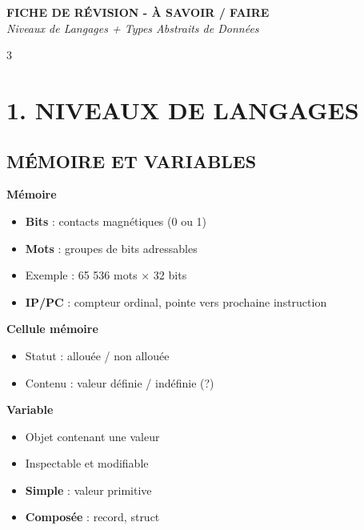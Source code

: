 \documentclass[10pt,a4paper,landscape]{article}
\begin{document}
\begin{center}
\LARGE\textbf{\color{titrebleu}FICHE DE RÉVISION - À SAVOIR / FAIRE}\\
\large\textit{Niveaux de Langages + Types Abstraits de Données}
\end{center}

\begin{multicols}{3}
\small

\section*{\color{titrebleu}1. NIVEAUX DE LANGAGES}

\subsection*{MÉMOIRE ET VARIABLES}

\begin{defbox}
\textbf{Mémoire}
\begin{itemize}
\item \textbf{Bits} : contacts magnétiques (0 ou 1)
\item \textbf{Mots} : groupes de bits adressables
\item Exemple : 65 536 mots × 32 bits
\item \textbf{IP/PC} : compteur ordinal, pointe vers prochaine instruction
\end{itemize}
\end{defbox}

\begin{defbox}
\textbf{Cellule mémoire}
\begin{itemize}
\item Statut : allouée / non allouée
\item Contenu : valeur définie / indéfinie (?)
\end{itemize}
\end{defbox}

\begin{defbox}
\textbf{Variable}
\begin{itemize}
\item Objet contenant une valeur
\item Inspectable et modifiable
\item \textbf{Simple} : valeur primitive
\item \textbf{Composée} : record, struct
\end{itemize}
\end{defbox}


\end{multicols}
\end{document}
